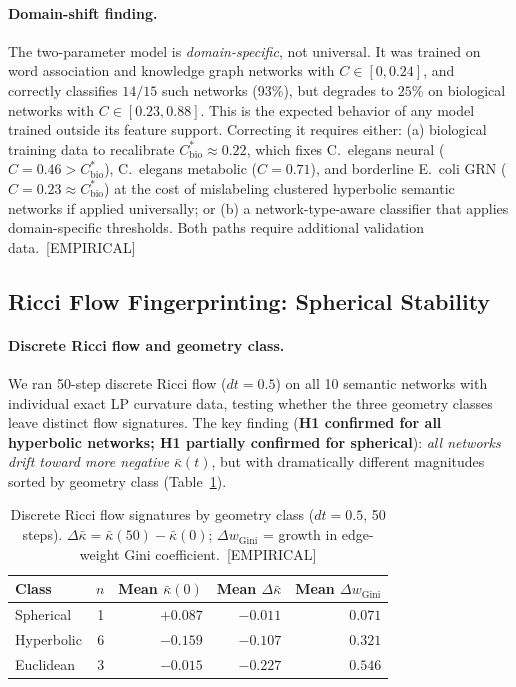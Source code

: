 \documentclass[11pt,a4paper]{article}
\newcommand{\kbar}{\bar{\kappa}}
\begin{document}
\paragraph{Domain-shift finding.}
The two-parameter model is \emph{domain-specific}, not universal. It was trained on word association and knowledge graph networks with $C \in [0, 0.24]$, and correctly classifies $14/15$ such networks (93\%), but degrades to $25\%$ on biological networks with $C \in [0.23, 0.88]$. This is the expected behavior of any model trained outside its feature support. Correcting it requires either: (a) biological training data to recalibrate $C^*_{\mathrm{bio}} \approx 0.22$, which fixes C.\ elegans neural ($C=0.46 > C^*_{\mathrm{bio}}$), C.\ elegans metabolic ($C=0.71$), and borderline E.\ coli GRN ($C=0.23 \approx C^*_{\mathrm{bio}}$) at the cost of mislabeling clustered hyperbolic semantic networks if applied universally; or (b) a network-type-aware classifier that applies domain-specific thresholds. Both paths require additional validation data.~[EMPIRICAL]

\subsection{Ricci Flow Fingerprinting: Spherical Stability}
\label{sec:ricci_flow_fingerprint}

\paragraph{Discrete Ricci flow and geometry class.}
We ran 50-step discrete Ricci flow ($dt = 0.5$) on all 10 semantic networks with individual exact LP curvature data, testing whether the three geometry classes leave distinct flow signatures. The key finding (\textbf{H1 confirmed for all hyperbolic networks; H1 partially confirmed for spherical}): \emph{all networks drift toward more negative} $\kbar(t)$, but with dramatically different magnitudes sorted by geometry class (Table~\ref{tab:ricci_flow}).

\begin{table}[h]
\centering
\small
\caption{Discrete Ricci flow signatures by geometry class ($dt=0.5$, 50 steps). $\Delta\kbar = \kbar(50) - \kbar(0)$; $\Delta w_{\mathrm{Gini}}$ = growth in edge-weight Gini coefficient.~[EMPIRICAL]}
\label{tab:ricci_flow}
\begin{tabular}{@{}lrrrr@{}}
\toprule
Class & $n$ & Mean $\kbar(0)$ & Mean $\Delta\kbar$ & Mean $\Delta w_{\mathrm{Gini}}$ \\
\midrule
Spherical  & 1 & $+0.087$ & $-0.011$ & $0.071$ \\
Hyperbolic & 6 & $-0.159$ & $-0.107$ & $0.321$ \\
Euclidean  & 3 & $-0.015$ & $-0.227$ & $0.546$ \\
\bottomrule
\end{tabular}
\end{table}
\end{document}
